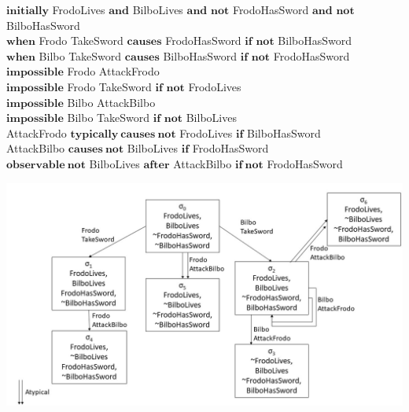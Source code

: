 \documentclass[11pt,a4paper]{article}
\begin{document}
    $\mathbf{initially}$ FrodoLives $\mathbf{and}$ BilboLives $\mathbf{and}$ $\mathbf{not}$ FrodoHasSword $\mathbf{and}$ $\mathbf{not}$ BilboHasSword\\    
    $\mathbf{when}$ Frodo TakeSword $\mathbf{causes}$ FrodoHasSword $\mathbf{if}$ $\mathbf{not}$ BilboHasSword\\    
    $\mathbf{when}$ Bilbo TakeSword $\mathbf{causes}$ BilboHasSword $\mathbf{if}$ $\mathbf{not}$ FrodoHasSword\\    
    $\mathbf{impossible}$ Frodo AttackFrodo\\ 
     $\mathbf{impossible}$ Frodo TakeSword $\mathbf{if}$ $\mathbf{not}$ FrodoLives\\   
    $\mathbf{impossible}$ Bilbo AttackBilbo\\   
    $\mathbf{impossible}$ Bilbo TakeSword $\mathbf{if}$ $\mathbf{not}$ BilboLives\\    
    AttackFrodo $\mathbf{typically} ~ \mathbf{causes~not}$ FrodoLives $\mathbf{if}$ BilboHasSword\\    
    AttackBilbo $\mathbf{causes~not}$ BilboLives $\mathbf{if}$ FrodoHasSword\\    
    $\mathbf{observable~not}$ BilboLives $\mathbf{after}$ AttackBilbo $\mathbf{if~not}$ FrodoHasSword
    \begin{center}
    
    \includegraphics[width=\textwidth]{resources/graf.jpg} 
    \end{center}
 

\newpage
\end{document}
